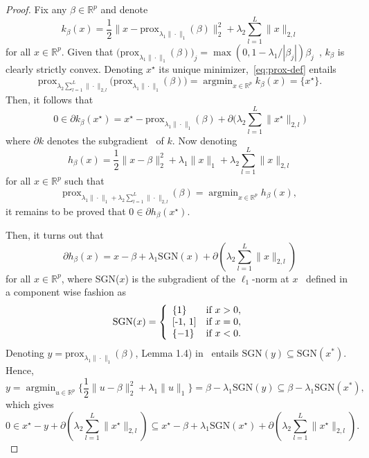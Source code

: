 \documentclass[11pt]{article}
\DeclareMathOperator{\argmin}{argmin}
\newcommand{\norm}[1]{\|#1\|}
\newcommand{\R}{\mathds R}
\begin{document}
\begin{proof}
Fix any $\beta \in \R^p$ and denote 
\begin{equation*}
    k_\beta(x) =  \frac{1}{2}\norm{ x - \text{prox}_{\lambda_1 \norm{\cdot}_1}(\beta)}_2^2 + \lambda_2 \sum_{l=1}^L \norm{x}_{2,l}
\end{equation*}
for all $x \in \R^p$. Given that $\big(\text{prox}_{\lambda_1 \norm{\cdot}_1}(\beta)\big)_j=\max(0, 1-\lambda_1/|\beta_j|)\beta_j$~\citep{bach2011optimization}, $k_\beta$ is clearly strictly convex. Denoting $x^\star$ its unique minimizer,~\eqref{eq:prox-def} entails 
\[\text{prox}_{\lambda_2 \sum_{l=1}^L \norm{\cdot}_{2,l}}\big(\text{prox}_{\lambda_1 \norm{\cdot}_1}(\beta)\big) = \argmin_{x \in \R^p} k_\beta(x) = \{x^\star\}.\]
Then, it follows that
\begin{equation}
    \label{eq:opt_gl}
    0 \in \partial k_\beta(x^\star) = x^\star - \text{prox}_{\lambda_1 \norm{\cdot}_1}(\beta) + \partial\big( \lambda_2 \sum_{l=1}^L \norm{x^\star}_{2,l}\big)
\end{equation}
where $\partial k$ denotes the subgradient~\citep{rockafellar1974} of $k$.
Now denoting
\[h_\beta(x) = \frac{1}{2}\norm{x - \beta}_2^2 + \lambda_1 \norm{x}_1 + \lambda_2 \sum_{l=1}^L \norm{x}_{2,l} \] 
for all $x \in \R^p$ such that
\[\text{prox}_{\lambda_1 \norm{\cdot}_1 + \lambda_2 \sum_{l=1}^L \norm{\cdot}_{2,l}}(\beta) = \argmin_{x\in \R^p} h_\beta(x),\]
it remains to be proved that $0 \in \partial h_\beta(x^\star)$.

Then, it turns out that 
\[ \partial h_\beta(x) = x - \beta + \lambda_1 \text{SGN}(x) + \partial( \lambda_2 \sum_{l=1}^L \norm{x}_{2, l})\]
for all $x \in \R^p$, where SGN($x$) is the subgradient of the $\ell_1$-norm at $x$~\citep{bach2011optimization} defined in a component wise fashion as
\[\text{SGN}(x) = 
\left\{
  \begin{array}{ll}
    \{1\} &\text{if } x > 0, \\ 
    $[-1, 1]$ &\text{if } x = 0, \\ 
    \{-1\} &\text{if } x < 0. 
  \end{array}
\right. \]
Denoting $y = \text{prox}_{\lambda_1\norm{\cdot}_1}(\beta)$, Lemma 1.4) in~\citet{yuan2011efficient} entails $\text{SGN}(y) \subseteq \text{SGN}(x^*)$. Hence,
\[ y = \argmin_{u \in \R^p} \big\{\frac{1}{2} \norm{u - \beta}_2^2 + \lambda_1 \norm{u}_1\big\} 
    = \beta - \lambda_1 \text{SGN}(y) \subseteq \beta - \lambda_1 \text{SGN}(x^*), \]
which gives
\[0 \in x^\star - y + \partial( \lambda_2 \sum_{l=1}^L \norm{x^\star}_{2, l} ) \subseteq x^\star- \beta + \lambda_1 \text{SGN}(x^\star) + \partial( \lambda_2 \sum_{l=1}^L \norm{x^\star}_{2, l} ).\]
\end{proof}
\end{document}
